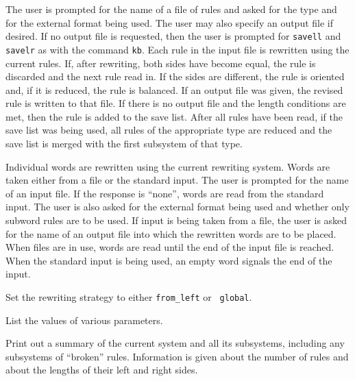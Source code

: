 \medskip
{}

\nobreak

The user is prompted for the name of a file of rules and asked for the
type and for the external format being used.  The user may also
specify an output file if desired.  If no output file is requested,
then the user is prompted for {\tt savell} and {\tt savelr} as with
the command {\tt kb}.  Each rule in the input file is rewritten using
the current rules.  If, after rewriting, both sides have become equal,
the rule is discarded and the next rule read in.  If the sides are
different, the rule is oriented and, if it is reduced, the rule is
balanced.  If an output file was given, the revised rule is written to
that file.  If there is no output file and the length conditions are
met, then the rule is added to the save list.  After all rules have
been read, if the save list was being used, all rules of the
appropriate type are reduced and the save list is merged with the
first subsystem of that type.

\medskip
{}

\nobreak

Individual words are rewritten using the current rewriting system.
Words are taken either from a file or the standard input.  The user is
prompted for the name of an input file.  If the response is ``none'',
words are read from the standard input.  The user is also asked for
the external format being used and whether only subword rules are to
be used.  If input is being taken from a file, the user is asked for
the name of an output file into which the rewritten words are to be
placed.  When files are in use, words are read until the end of the
input file is reached.  When the standard input is being used, an
empty word signals the end of the input.

\medskip
{}

\nobreak

Set the rewriting strategy to either {\tt from\_left} or {\tt
global}.

\medskip
{}

\nobreak

List the values of various parameters.

\medskip
{}

\nobreak

Print out a summary of the current system and all its subsystems,
including any subsystems of ``broken'' rules.  Information is given
about the number of rules and about the lengths of their left and
right sides.

